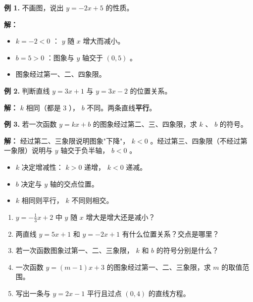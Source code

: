 \begin{workedexamples}


\textbf{例 1.} 不画图，说出 $y = -2x + 5$ 的性质。

\textbf{解：}

\begin{itemize}
  \item $k = -2 < 0$ ： $y$ 随 $x$ 增大而减小。
  \item $b = 5 > 0$ ：图象与 $y$ 轴交于 $(0, 5)$ 。
  \item 图象经过第一、二、四象限。
\end{itemize}


\textbf{例 2.} 判断直线 $y = 3x + 1$ 与 $y = 3x - 2$ 的位置关系。

\textbf{解：} $k$ 相同（都是 $3$ ）， $b$ 不同。两条直线\textbf{平行}。

\textbf{例 3.} 若一次函数 $y = kx + b$ 的图象经过第二、三、四象限，求 $k$ 、 $b$ 的符号。

\textbf{解：} 经过第二、三象限说明图象"下降"， $k < 0$ 。经过第三、四象限（不经过第一象限）说明与 $y$ 轴交于负半轴， $b < 0$ 。

\end{workedexamples}

\begin{keytakeaway}


\begin{itemize}
  \item $k$ 决定增减性： $k > 0$ 递增， $k < 0$ 递减。
  \item $b$ 决定与 $y$ 轴的交点位置。
  \item $k$ 相同则平行， $k$ 不同则相交。
\end{itemize}


\end{keytakeaway}

\begin{practice}


\begin{enumerate}
  \item $y = -\frac{1}{3}x + 2$ 中 $y$ 随 $x$ 增大是增大还是减小？
  \item 两直线 $y = 5x + 1$ 和 $y = -2x + 1$ 有什么位置关系？交点是哪里？
  \item 若一次函数图象过第一、二、三象限， $k$ 和 $b$ 的符号分别是什么？
  \item 一次函数 $y = (m-1)x + 3$ 的图象经过第一、二、三象限，求 $m$ 的取值范围。
  \item 写出一条与 $y = 2x - 1$ 平行且过点 $(0, 4)$ 的直线方程。
\end{enumerate}


\end{practice}

